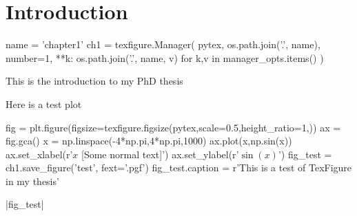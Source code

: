 \chapter{Introduction}\label{ch:introduction}

\begin{pycode}[chapter1]
name = 'chapter1'
ch1 = texfigure.Manager(
    pytex,
    os.path.join('.', name),
    number=1,
    **{k: os.path.join('.', name, v) for k,v in manager_opts.items()}
)
\end{pycode}

This is the introduction to my PhD thesis

\citet{bradshaw_cooling_2010} %

Here is a test plot

\begin{pycode}[chapter1]
fig = plt.figure(figsize=texfigure.figsize(pytex,scale=0.5,height_ratio=1,))
ax = fig.gca()
x = np.linspace(-4*np.pi,4*np.pi,1000)
ax.plot(x,np.sin(x))
ax.set_xlabel(r'$x$ [Some normal text]')
ax.set_ylabel(r'$\sin{(x)}$')
fig_test = ch1.save_figure('test', fext='.pgf')
fig_test.caption = r'This is a test of TexFigure in my thesis'
\end{pycode}
\py[chapter1]|fig_test|
